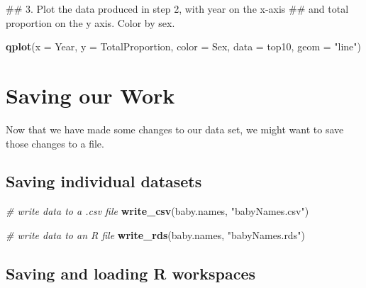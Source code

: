 \documentclass[]{book}
\newenvironment{Shaded}{\begin{snugshade}}{\end{snugshade}}
\newcommand{\KeywordTok}[1]{\textcolor[rgb]{0.13,0.29,0.53}{\textbf{#1}}}
\newcommand{\DataTypeTok}[1]{\textcolor[rgb]{0.13,0.29,0.53}{#1}}
\newcommand{\StringTok}[1]{\textcolor[rgb]{0.31,0.60,0.02}{#1}}
\newcommand{\CommentTok}[1]{\textcolor[rgb]{0.56,0.35,0.01}{\textit{#1}}}
\newcommand{\NormalTok}[1]{#1}
\begin{document}
\begin{Shaded}
\begin{Highlighting}[]
\NormalTok{## 3.  Plot the data produced in step 2, with year on the x-axis}
\NormalTok{##     and total proportion on the y axis. Color by sex.}
\end{Highlighting}
\end{Shaded}

\begin{Shaded}
\begin{Highlighting}[]
\KeywordTok{qplot}\NormalTok{(}\DataTypeTok{x =}\NormalTok{ Year, }\DataTypeTok{y =}\NormalTok{ TotalProportion, }\DataTypeTok{color =}\NormalTok{ Sex,}
      \DataTypeTok{data =}\NormalTok{ top10,}
      \DataTypeTok{geom =} \StringTok{"line"}\NormalTok{)}
\end{Highlighting}
\end{Shaded}

\chapter{Saving our Work}\label{saving-our-work}

Now that we have made some changes to our data set, we might want to
save those changes to a file.

\section{Saving individual datasets}\label{saving-individual-datasets}

\begin{Shaded}
\begin{Highlighting}[]
\CommentTok{# write data to a .csv file}
\KeywordTok{write_csv}\NormalTok{(baby.names, }\StringTok{"babyNames.csv"}\NormalTok{)}
\end{Highlighting}
\end{Shaded}

\begin{Shaded}
\begin{Highlighting}[]
\CommentTok{# write data to an R file}
\KeywordTok{write_rds}\NormalTok{(baby.names, }\StringTok{"babyNames.rds"}\NormalTok{)}
\end{Highlighting}
\end{Shaded}

\section{Saving and loading R
workspaces}\label{saving-and-loading-r-workspaces}
\end{document}
